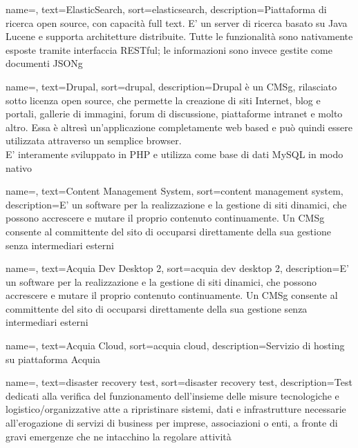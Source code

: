 {
	name=,
	text=ElasticSearch,
	sort=elasticsearch,
	description={Piattaforma di ricerca \gls{open source}, con capacità full text. E' un server di ricerca basato su \gls{Java Lucene} e supporta architetture distribuite. Tutte le funzionalità sono nativamente esposte tramite interfaccia \gls{RESTful}; le informazioni sono invece gestite come documenti \gls{JSONg}}
}

{
	name=,
	text=Drupal,
	sort=drupal,
	description={Drupal è un \gls{CMSg}, rilasciato sotto licenza \gls{open source}, che permette la creazione di siti Internet, blog e portali, gallerie di immagini, forum di discussione, piattaforme intranet e molto altro. Essa è altresì un’applicazione completamente web based e può quindi essere utilizzata attraverso un semplice browser. \\
		E' interamente sviluppato in \gls{PHP} e utilizza come base di dati \gls{MySQL} in modo nativo}
}

{
	name=,
	text=Content Management System,
	sort=content management system,
	description={E’ un software per la realizzazione e la gestione di siti dinamici, che possono accrescere e mutare il proprio contenuto continuamente. Un \gls{CMSg} consente al committente del sito di occuparsi direttamente della sua gestione senza intermediari esterni}
}

{
	name=,
	text=Acquia Dev Desktop 2,
	sort=acquia dev desktop 2,
	description={E’ un software per la realizzazione e la gestione di siti dinamici, che possono accrescere e mutare il proprio contenuto continuamente. Un \gls{CMSg} consente al committente del sito di occuparsi direttamente della sua gestione senza intermediari esterni}
}

{
	name=,
	text=Acquia Cloud,
	sort=acquia cloud,
	description={Servizio di hosting su piattaforma Acquia}
}

{
	name=,
	text=disaster recovery test,
	sort=disaster recovery test,
	description={Test dedicati alla verifica del funzionamento dell'insieme delle misure tecnologiche e logistico/organizzative atte a ripristinare sistemi, dati e infrastrutture necessarie all'erogazione di servizi di business per imprese, associazioni o enti, a fronte di gravi emergenze che ne intacchino la regolare attività}
}

